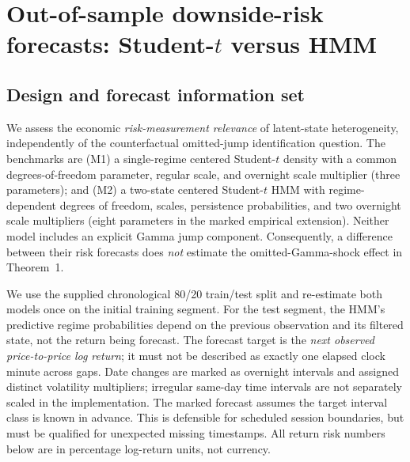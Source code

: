 \documentclass[11pt,a4paper]{article}
\begin{document}
\section{Out-of-sample downside-risk forecasts: Student-$t$ versus HMM}\label{sec:var}
\subsection{Design and forecast information set}
We assess the economic \emph{risk-measurement relevance} of latent-state heterogeneity, independently of the counterfactual omitted-jump identification question. The benchmarks are (M1) a single-regime centered Student-$t$ density with a common degrees-of-freedom parameter, regular scale, and overnight scale multiplier (three parameters); and (M2) a two-state centered Student-$t$ HMM with regime-dependent degrees of freedom, scales, persistence probabilities, and two overnight scale multipliers (eight parameters in the marked empirical extension). Neither model includes an explicit Gamma jump component. Consequently, a difference between their risk forecasts does \emph{not} estimate the omitted-Gamma-shock effect in Theorem~1.

We use the supplied chronological 80/20 train/test split and re-estimate both models once on the initial training segment. For the test segment, the HMM's predictive regime probabilities depend on the previous observation and its filtered state, not the return being forecast. The forecast target is the \emph{next observed price-to-price log return}; it must not be described as exactly one elapsed clock minute across gaps. Date changes are marked as overnight intervals and assigned distinct volatility multipliers; irregular same-day time intervals are not separately scaled in the implementation. The marked forecast assumes the target interval class is known in advance. This is defensible for scheduled session boundaries, but must be qualified for unexpected missing timestamps. All return risk numbers below are in percentage log-return units, not currency.
\end{document}
